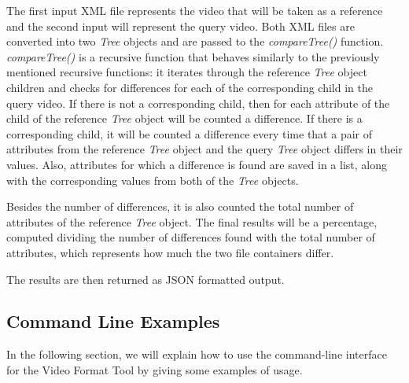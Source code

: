 The first input XML file represents the video that will be taken as a reference and the second input will represent the query video. Both XML files are converted into two \emph{Tree} objects and are passed to the \emph{compareTree()} function. \emph{compareTree()} is a recursive function that behaves similarly to the previously mentioned recursive functions: it iterates through the reference \emph{Tree} object children and checks for differences for each of the corresponding child in the query video. If there is not a corresponding child, then for each attribute of the child of the reference \emph{Tree} object will be counted a difference. If there is a corresponding child, it will be counted a difference every time that a pair of attributes from the reference \emph{Tree} object and the query \emph{Tree} object differs in their values. Also, attributes for which a difference is found are saved in a list, along with the corresponding values from both of the \emph{Tree} objects.

Besides the number of differences, it is also counted the total number of attributes of the reference \emph{Tree} object. The final results will be a percentage, computed dividing the number of differences found with the total number of attributes, which represents how much the two file containers differ.

The results are then returned as JSON formatted output.

\subsection{Command Line Examples}

In the following section, we will explain how to use the command-line interface for the Video Format Tool by giving some examples of usage.

